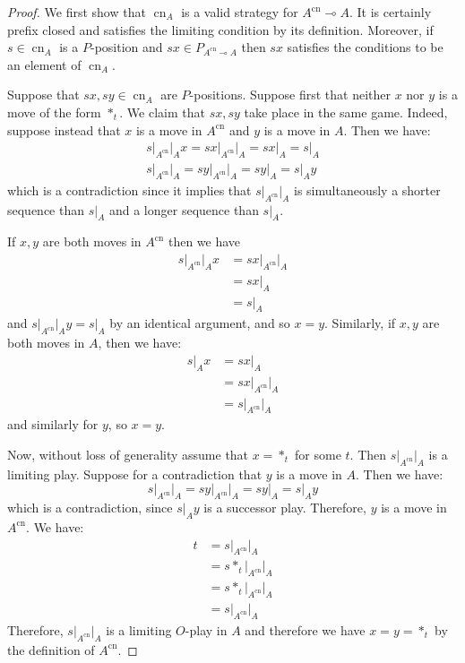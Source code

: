 \documentclass[11pt]{article} %
\theoremstyle{plain} %
\theoremstyle{definition} %
\theoremstyle{note}
\theoremstyle{exercisestyle}
\renewcommand{\implies}{\multimap}
\DeclareMathOperator{\cn}{cn}
\begin{document}
\begin{proof}
  We first show that $\cn_A$ is a valid strategy for $A^{\cn}\implies A$.  It is certainly prefix closed and satisfies the limiting condition by its definition.  Moreover, if $s\in\cn_A$ is a $P$-position and $sx\in P_{A^{\cn}\implies A}$ then $sx$ satisfies the conditions to be an element of $\cn_A$.

  Suppose that $sx, sy\in \cn_A$ are $P$-positions.  Suppose first that neither $x$ nor $y$ is a move of the form $*_t$.  We claim that $sx,sy$ take place in the same game.  Indeed, suppose instead that $x$ is a move in $A^{\cn}$ and $y$ is a move in $A$.  Then we have:
  \begin{gather*}
    s\vert_{A^{\cn}}\vert_A x = sx\vert_{A^{\cn}}\vert_A = sx\vert_A = s\vert_A\\
    s\vert_{A^{\cn}}\vert_A = sy\vert_{A^{\cn}}\vert_A = sy\vert_A = s\vert_Ay
  \end{gather*}
  which is a contradiction since it implies that $s\vert_{A^{\cn}}\vert_A$ is simultaneously a shorter sequence than $s\vert_A$ and a longer sequence than $s\vert_A$.

  If $x,y$ are both moves in $A^{\cn}$ then we have
  \begin{align*}
    s\vert_{A^{\cn}}\vert_A x &= sx\vert_{A^{\cn}}\vert_A \\
    & = sx\vert_A\\
    & = s\vert_A
  \end{align*}
  and $s\vert_{A^{\cn}}\vert_Ay=s\vert_A$ by an identical argument, and so $x=y$.  Similarly, if $x,y$ are both moves in $A$, then we have:
  \begin{align*}
    s\vert_A x &= sx\vert_A \\
    &= sx\vert_{A^{\cn}}\vert_A\\
    &= s\vert_{A^{\cn}}\vert_A
  \end{align*}
  and similarly for $y$, so $x=y$.

  Now, without loss of generality assume that $x=*_t$ for some $t$.  Then $s\vert_{A^{\cn}}\vert_A$ is a limiting play.  Suppose for a contradiction that $y$ is a move in $A$.  Then we have:
  \[
    s\vert_{A^{\cn}}\vert_A = sy\vert_{A^{\cn}}\vert_A=sy\vert_A = s\vert_Ay
    \]
  which is a contradiction, since $s\vert_Ay$ is a successor play.  Therefore, $y$ is a move in $A^{\cn}$.  We have:
  \begin{align*}
    t &= s\vert_{A^{\cn}}\vert_A\\
    &= s*_t\vert_{A^{\cn}}\vert_A\\
    &= s*_t\vert_{A^{\cn}}\vert_A\\
    &= s\vert_{A^{\cn}}\vert_A
  \end{align*}
  Therefore, $s\vert_{A^{\cn}}\vert_A$ is a limiting $O$-play in $A$ and therefore we have $x=y=*_t$ by the definition of $A^{\cn}$.  


\end{proof}
\end{document}
